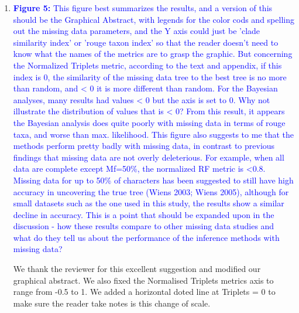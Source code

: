 \documentclass[12pt,letterpaper]{article}
\begin{document}
\begin{enumerate}
\item{\textcolor{blue}{\textbf{Figure 5:} This figure best summarizes the results, and a version of this should be the Graphical Abstract, with legends for the color cods and spelling out the missing data parameters, and the Y axis could just be 'clade similarity index' or 'rouge taxon index' so that the reader doesn't need to know what the names of the metrics are to grasp the graphic.
But concerning the Normalized Triplets metric, according to the text and appendix, if this index is 0, the similarity of the missing data tree to the best tree is no more than random, and < 0 it is more different than random.
For the Bayesian analyses, many results had values < 0 but the axis is set to 0.
Why not illustrate the distribution of values that is < 0? %
From this result, it appears the Bayesian analysis does quite poorly with missing data in terms of rouge taxa, and worse than max. likelihood.
This figure also suggests to me that the methods perform pretty badly with missing data, in contrast to previous findings that missing data are not overly deleterious.
For example, when all data are complete except Mf=50\%, the normalized RF metric is <0.8.
Missing data for up to 50\% of characters has been suggested to still have high accuracy in uncovering the true tree (Wiens 2003; Wiens 2005), although for small datasets such as the one used in this study, the results show a similar decline in accuracy.
This is a point that should be expanded upon in the discussion - how these results compare to other missing data studies and what do they tell us about the performance of the inference methods with missing data?}}

We thank the reviewer for this excellent suggestion and modified our graphical abstract. We also fixed the Normalised Triplets metrics axis to range from -0.5 to 1. We added a horizontal doted line at Triplets = 0 to make sure the reader take notes is this change of scale.





\end{enumerate}
\end{document}
